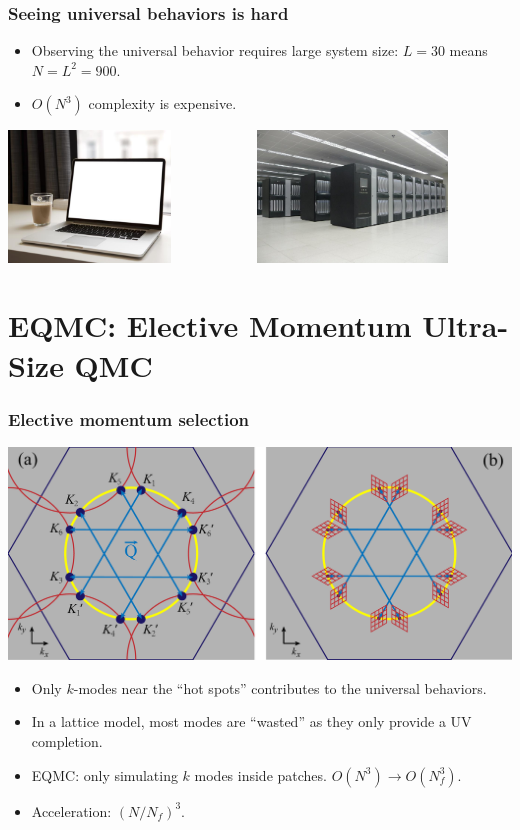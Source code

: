 \documentclass[xcolor=table, 10pt, aspectratio=43]{beamer}
\begin{document}
\begin{frame}
  \frametitle{Seeing universal behaviors is hard}
  \begin{itemize}
    \item Observing the universal behavior requires large system size: $L=30$ means $N=L^2=900$.
    \item \alert{$O(N^3)$} complexity is expensive.
  \end{itemize}
  \begin{center}
    \includegraphics[height=3.5cm]{laptop_coffee}
    ~~~~~~~~~~~
    \includegraphics[height=3.5cm]{tianhe}
  \end{center}
\end{frame}

\section{EQMC: Elective Momentum Ultra-Size QMC}

\begin{frame}
  \frametitle{Elective momentum selection}
  \begin{center}
    \includegraphics[width=.8\textwidth]{kmeshtri}
  \end{center}
\begin{itemize}
  \item Only $k$-modes near the ``hot spots'' contributes to the universal behaviors.
  \item In a lattice model, most modes are ``wasted'' as they only provide a UV completion.
  \item EQMC: only simulating $k$ modes inside patches.
  $O(N^3)\rightarrow O(N_f^3)$.
  \item Acceleration: $(N/N_f)^3$.
\end{itemize}
\end{frame}
\end{document}
